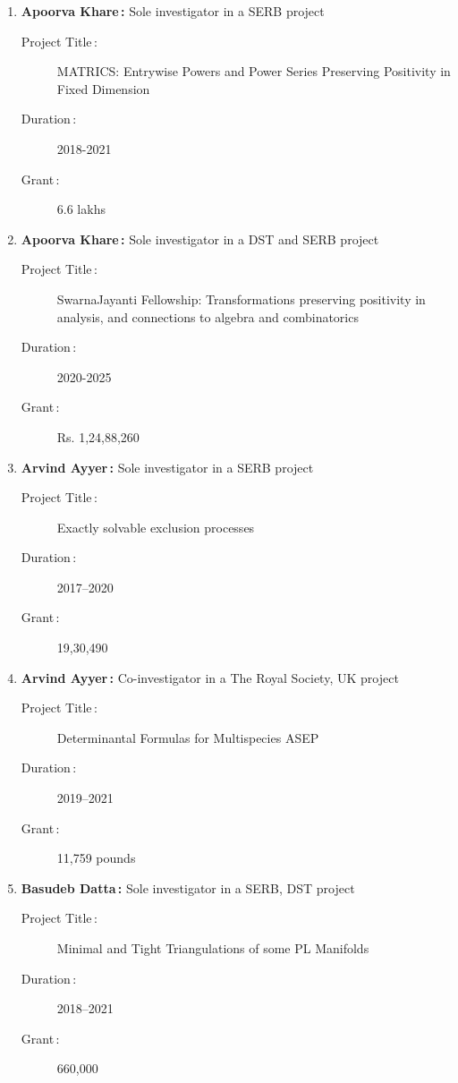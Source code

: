 \begin{enumerate}
\item {\bf Apoorva Khare\,:} Sole investigator in a SERB project
\begin{description}
  \item[Project Title\,:] MATRICS: Entrywise Powers and Power Series Preserving Positivity in Fixed Dimension
  \item[Duration\,:] 2018-2021
  \item[Grant\,:] 6.6 lakhs
\end{description}


\item {\bf Apoorva Khare\,:} Sole investigator in a DST and SERB project
\begin{description}
  \item[Project Title\,:] SwarnaJayanti Fellowship: Transformations preserving positivity in analysis, and connections to algebra and combinatorics
  \item[Duration\,:] 2020-2025
  \item[Grant\,:] Rs. 1,24,88,260
\end{description}


\item {\bf Arvind Ayyer\,:} Sole investigator in a SERB project
\begin{description}
  \item[Project Title\,:] Exactly solvable exclusion processes
  \item[Duration\,:] 2017--2020
  \item[Grant\,:] 19,30,490
\end{description}


\item {\bf Arvind Ayyer\,:} Co-investigator in a The Royal Society, UK project
\begin{description}
  \item[Project Title\,:] Determinantal Formulas for Multispecies ASEP
  \item[Duration\,:] 2019--2021
  \item[Grant\,:] 11,759 pounds
\end{description}


\item {\bf Basudeb Datta\,:} Sole investigator in a SERB, DST project
\begin{description}
  \item[Project Title\,:] Minimal and Tight Triangulations of some PL Manifolds
  \item[Duration\,:] 2018--2021
  \item[Grant\,:] 660,000
\end{description}



\end{enumerate}
